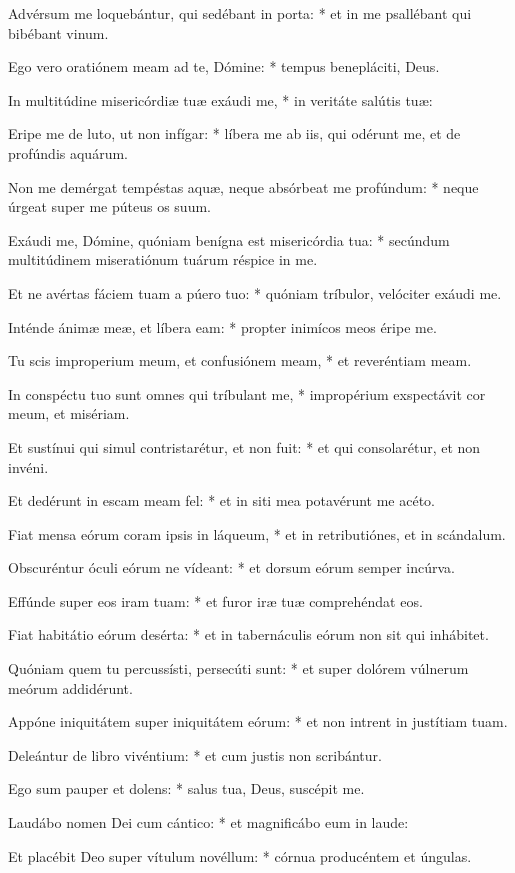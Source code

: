Advérsum me loquebántur, qui sedébant in porta: * et in me psallébant qui bibébant vinum.

Ego vero oratiónem meam ad te, Dómine: * tempus benepláciti, Deus.

In multitúdine misericórdiæ tuæ exáudi me, * in veritáte salútis tuæ:

Eripe me de luto, ut non infígar: * líbera me ab iis, qui odérunt me, et de profúndis aquárum.

Non me demérgat tempéstas aquæ, neque absórbeat me profúndum: * neque úrgeat super me púteus os suum.

Exáudi me, Dómine, quóniam benígna est misericórdia tua: * secúndum multitúdinem miseratiónum tuárum réspice in me.

Et ne avértas fáciem tuam a púero tuo: * quóniam tríbulor, velóciter exáudi me.

Inténde ánimæ meæ, et líbera eam: * propter inimícos meos éripe me.

Tu scis improperium meum, et confusiónem meam, * et reveréntiam meam.

In conspéctu tuo sunt omnes qui tríbulant me, * impropérium exspectávit cor meum, et misériam.

Et sustínui qui simul contristarétur, et non fuit: * et qui consolarétur, et non invéni.

Et dedérunt in escam meam fel: * et in siti mea potavérunt me acéto.

Fiat mensa eórum coram ipsis in láqueum, * et in retributiónes, et in scándalum.

Obscuréntur óculi eórum ne vídeant: * et dorsum eórum semper incúrva.

Effúnde super eos iram tuam: * et furor iræ tuæ comprehéndat eos.

Fiat habitátio eórum desérta: * et in tabernáculis eórum non sit qui inhábitet.

Quóniam quem tu percussísti, persecúti sunt: * et super dolórem vúlnerum meórum addidérunt.

Appóne iniquitátem super iniquitátem eórum: * et non intrent in justítiam tuam.

Deleántur de libro vivéntium: * et cum justis non scribántur.

Ego sum pauper et dolens: * salus tua, Deus, suscépit me.

Laudábo nomen Dei cum cántico: * et magnificábo eum in laude:

Et placébit Deo super vítulum novéllum: * córnua producéntem et úngulas.

